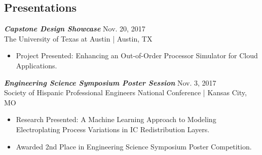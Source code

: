 \documentclass[letter]{res}
\begin{document}
\begin{resume}


 
 

\section{Presentations}
{\sl \textbf{Capstone Design Showcase}} \hfill Nov. 20, 2017\\
The University of Texas at Austin | Austin, TX \newline

 \vspace{-4mm}
    
 \begin{itemize}
 \item Project Presented: Enhancing an Out-of-Order Processor Simulator for Cloud Applications.
 \end{itemize}
 
\vspace{-2mm}
{\sl \textbf{Engineering Science Symposium Poster Session}} \hfill Nov. 3, 2017\\
Society of Hispanic Professional Engineers National Conference | Kansas City, MO \newline

 \vspace{-4mm}
    
 \begin{itemize}
 \item Research Presented: A Machine Learning Approach to Modeling Electroplating Process Variations in IC Redistribution Layers.
 \item Awarded 2nd Place in Engineering Science Symposium Poster Competition.
 \end{itemize}
 
\vspace{-2mm}


\end{resume}
\end{document}
